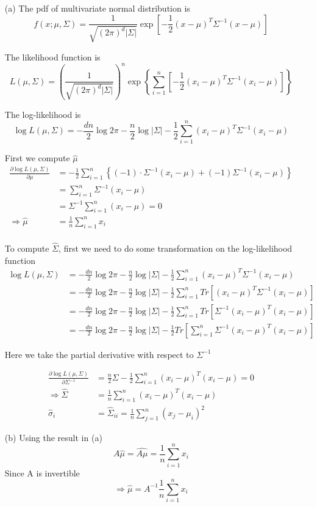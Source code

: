 \documentclass[a4paper,12pt]{article}
\begin{document}
\begin{itemize}
\item[(a)]
The pdf of multivariate normal distribution is
$$
f(x;\mu,\Sigma) = \frac{1}{\sqrt{(2 \pi)^d |\Sigma|}} \exp \left[ -\frac{1}{2} (x - \mu)^T \Sigma^{-1} (x - \mu)\right]
$$

The likelihood function is
$$
L(\mu,\Sigma) = \left (\frac{1}{\sqrt{(2 \pi)^d |\Sigma|}} \right )^n  \exp \left \{ \sum_{i=1}^n \left[ -\frac{1}{2} (x_i - \mu)^T \Sigma^{-1} (x_i - \mu)\right] \right \}
$$

The log-likelihood is
$$
\log L(\mu,\Sigma) = -\frac{dn}{2} \log 2\pi - \frac{n}{2} \log |\Sigma| - \frac{1}{2} \sum_{i=1}^n (x_i - \mu)^T \Sigma^{-1} (x_i - \mu)
$$

First we compute $\hat \mu$
\begin{align*}
\frac{\partial \log L(\mu,\Sigma) }{\partial \mu} 
&= -\frac{1}{2} \sum_{i=1}^n \left \{ (-1) \cdot \Sigma^{-1}(x_i - \mu) + (-1) \Sigma^{-1} (x_i - \mu)\right \} \\
&= \sum_{i=1}^n \Sigma^{-1}(x_i - \mu) \\
&= \Sigma^{-1}\sum_{i=1}^n (x_i - \mu) = 0 \\
\Rightarrow \hat \mu &= \frac{1}{n} \sum_{i=1}^n x_i \\
\end{align*}

To compute $\hat \Sigma$, first we need to do some transformation on the log-likelihood function
\begin{align*}
\log L(\mu,\Sigma) 
&= -\frac{dn}{2} \log 2\pi - \frac{n}{2} \log |\Sigma| - \frac{1}{2} \sum_{i=1}^n (x_i - \mu)^T \Sigma^{-1} (x_i - \mu) \\
&= -\frac{dn}{2} \log 2\pi - \frac{n}{2} \log |\Sigma| - \frac{1}{2} \sum_{i=1}^n Tr \left [  (x_i - \mu)^T \Sigma^{-1} (x_i - \mu) \right ] \\
&= -\frac{dn}{2} \log 2\pi - \frac{n}{2} \log |\Sigma| - \frac{1}{2} \sum_{i=1}^n Tr \left [ \Sigma^{-1}  (x_i - \mu)^T (x_i - \mu) \right ] \\
&= -\frac{dn}{2} \log 2\pi - \frac{n}{2} \log |\Sigma| - \frac{1}{2} Tr \left [ \sum_{i=1}^n \Sigma^{-1}  (x_i - \mu)^T (x_i - \mu) \right ] 
\end{align*}

Here we take the partial derivative with respect to $\Sigma^{-1}$

\begin{align*}
\frac{\partial \log L(\mu,\Sigma) }{\partial \Sigma^{-1}}
&= \frac{n}{2}  \Sigma - \frac{1}{2} \sum_{i=1}^n  (x_i - \mu)^T (x_i - \mu)  = 0  \\
\Rightarrow \hat \Sigma &= \frac{1}{n} \sum_{i=1}^n  (x_i - \mu)^T (x_i - \mu) \\
\hat \sigma_i &= \hat \Sigma_{ii} =  \frac{1}{n} \sum_{j=1}^n (x_j - \mu_i)^2
\end{align*}


\clearpage

\item[(b)]
Using the result in (a)
$$
A \hat \mu = \widehat{A \mu} =  \frac{1}{n} \sum_{i=1}^n x_i
$$
Since A is invertible
$$
\Rightarrow \hat \mu = A^{-1}  \frac{1}{n} \sum_{i=1}^n x_i
$$
\end{itemize}
\clearpage
\end{document}
